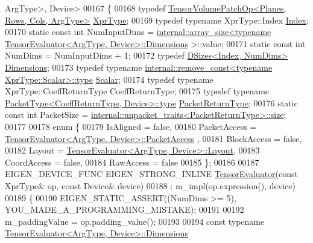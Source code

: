 \begin{DoxyCode}
      ArgType>, Device>
00167 \{
00168   \textcolor{keyword}{typedef} \hyperlink{class_eigen_1_1_tensor_volume_patch_op}{TensorVolumePatchOp<Planes, Rows, Cols, ArgType>} 
      \hyperlink{class_eigen_1_1_tensor_volume_patch_op}{XprType};
00169   \textcolor{keyword}{typedef} \textcolor{keyword}{typename} XprType::Index \hyperlink{namespace_eigen_a62e77e0933482dafde8fe197d9a2cfde}{Index};
00170   \textcolor{keyword}{static} \textcolor{keyword}{const} \textcolor{keywordtype}{int} NumInputDims = 
      \hyperlink{struct_eigen_1_1internal_1_1array__size}{internal::array\_size<typename TensorEvaluator<ArgType, Device>::Dimensions}
      >::value;
00171   \textcolor{keyword}{static} \textcolor{keyword}{const} \textcolor{keywordtype}{int} NumDims = NumInputDims + 1;
00172   \textcolor{keyword}{typedef} \hyperlink{struct_eigen_1_1_d_sizes}{DSizes<Index, NumDims>} \hyperlink{struct_eigen_1_1_d_sizes}{Dimensions};
00173   \textcolor{keyword}{typedef} \textcolor{keyword}{typename} \hyperlink{group___sparse_core___module}{internal::remove\_const<typename XprType::Scalar>::type}
       \hyperlink{group___sparse_core___module}{Scalar};
00174   \textcolor{keyword}{typedef} \textcolor{keyword}{typename} XprType::CoeffReturnType CoeffReturnType;
00175   \textcolor{keyword}{typedef} \textcolor{keyword}{typename} \hyperlink{group___sparse_core___module}{PacketType<CoeffReturnType, Device>::type} 
      \hyperlink{group___sparse_core___module}{PacketReturnType};
00176   \textcolor{keyword}{static} \textcolor{keyword}{const} \textcolor{keywordtype}{int} PacketSize = 
      \hyperlink{struct_eigen_1_1internal_1_1unpacket__traits}{internal::unpacket\_traits<PacketReturnType>::size};
00177 
00178   \textcolor{keyword}{enum} \{
00179     IsAligned = \textcolor{keyword}{false},
00180     PacketAccess = \hyperlink{struct_eigen_1_1_tensor_evaluator}{TensorEvaluator<ArgType, Device>::PacketAccess}
      ,
00181     BlockAccess = \textcolor{keyword}{false},
00182     Layout = \hyperlink{struct_eigen_1_1_tensor_evaluator}{TensorEvaluator<ArgType, Device>::Layout},
00183     CoordAccess = \textcolor{keyword}{false},
00184     RawAccess = \textcolor{keyword}{false}
00185   \};
00186 
00187   EIGEN\_DEVICE\_FUNC EIGEN\_STRONG\_INLINE \hyperlink{struct_eigen_1_1_tensor_evaluator}{TensorEvaluator}(\textcolor{keyword}{const} XprType& op, \textcolor{keyword}{const} Device& 
      device)
00188       : m\_impl(op.expression(), device)
00189   \{
00190     EIGEN\_STATIC\_ASSERT((NumDims >= 5), YOU\_MADE\_A\_PROGRAMMING\_MISTAKE);
00191 
00192     m\_paddingValue = op.padding\_value();
00193 
00194     \textcolor{keyword}{const} \textcolor{keyword}{typename} \hyperlink{struct_eigen_1_1_tensor_evaluator}{TensorEvaluator<ArgType, Device>::Dimensions}

\end{DoxyCode}
